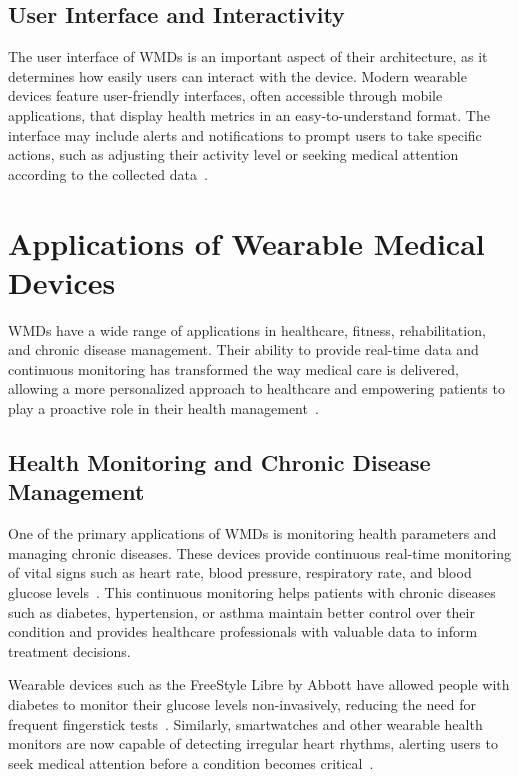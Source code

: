 \documentclass[journal]{IEEEtran}
\begin{document}
    \subsection{User Interface and Interactivity}
    
    The user interface of WMDs is an important aspect of their architecture, as it determines how easily users can interact with the device. Modern wearable devices feature user-friendly interfaces, often accessible through mobile applications, that display health metrics in an easy-to-understand format. The interface may include alerts and notifications to prompt users to take specific actions, such as adjusting their activity level or seeking medical attention according to the collected data~\cite{Nahavandi2022}.


\section{Applications of Wearable Medical Devices}
\label{5.Applications}

WMDs have a wide range of applications in healthcare, fitness, rehabilitation, and chronic disease management. Their ability to provide real-time data and continuous monitoring has transformed the way medical care is delivered, allowing a more personalized approach to healthcare and empowering patients to play a proactive role in their health management~\cite{Hindelang2024, Babu2024, Cusack2024}.

    \subsection{Health Monitoring and Chronic Disease Management}

    One of the primary applications of WMDs is monitoring health parameters and managing chronic diseases. These devices provide continuous real-time monitoring of vital signs such as heart rate, blood pressure, respiratory rate, and blood glucose levels~\cite{Dias2018}. This continuous monitoring helps patients with chronic diseases such as diabetes, hypertension, or asthma maintain better control over their condition and provides healthcare professionals with valuable data to inform treatment decisions.

    Wearable devices such as the FreeStyle Libre by Abbott have allowed people with diabetes to monitor their glucose levels non-invasively, reducing the need for frequent fingerstick tests~\cite{Ates2022, Luo2024}. Similarly, smartwatches and other wearable health monitors are now capable of detecting irregular heart rhythms, alerting users to seek medical attention before a condition becomes critical~\cite{Cusack2024}.
\end{document}
